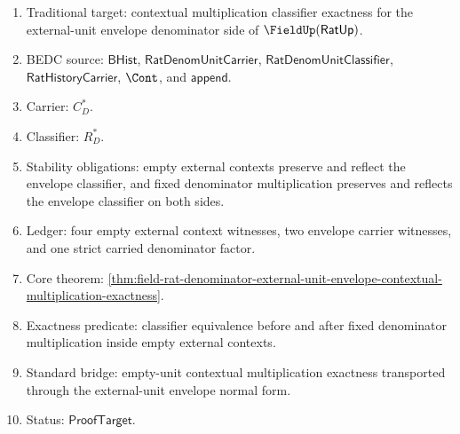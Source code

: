 \begin{enumerate}
  \item Traditional target: contextual multiplication classifier exactness for
  the external-unit envelope denominator side of $\FieldUp(\mathsf{RatUp})$.
  \item BEDC source: $\mathsf{BHist}$,
  $\mathsf{RatDenomUnitCarrier}$, $\mathsf{RatDenomUnitClassifier}$,
  $\mathsf{RatHistoryCarrier}$, $\Cont$, and $\mathsf{append}$.
  \item Carrier: $C_D^\ast$.
  \item Classifier: $R_D^\ast$.
  \item Stability obligations: empty external contexts preserve and reflect
  the envelope classifier, and fixed denominator multiplication preserves and
  reflects the envelope classifier on both sides.
  \item Ledger: four empty external context witnesses, two envelope carrier
  witnesses, and one strict carried denominator factor.
  \item Core theorem:
  \autoref{thm:field-rat-denominator-external-unit-envelope-contextual-multiplication-exactness}.
  \item Exactness predicate: classifier equivalence before and after fixed
  denominator multiplication inside empty external contexts.
  \item Standard bridge: empty-unit contextual multiplication exactness
  transported through the external-unit envelope normal form.
  \item Status: $\mathsf{ProofTarget}$.
\end{enumerate}

